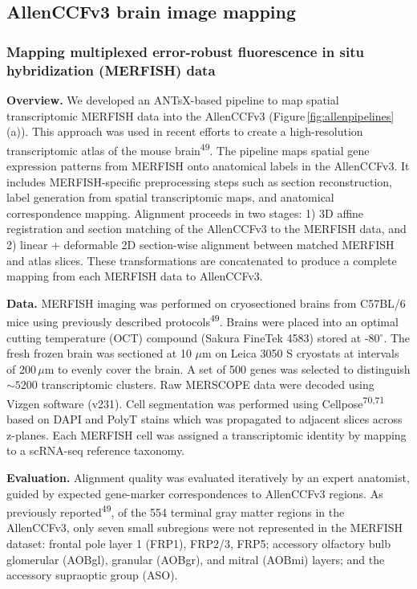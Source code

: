 \documentclass[
  12pt,
]{article}
\begin{document}
\subsection{AllenCCFv3 brain image
mapping}\label{allenccfv3-brain-image-mapping}

\subsubsection{Mapping multiplexed error-robust fluorescence in situ
hybridization (MERFISH)
data}\label{mapping-multiplexed-error-robust-fluorescence-in-situ-hybridization-merfish-data}

\textbf{Overview.} We developed an ANTsX-based pipeline to map spatial
transcriptomic MERFISH data into the AllenCCFv3
(Figure\,\ref{fig:allenpipelines}(a)). This approach was used in recent
efforts to create a high-resolution transcriptomic atlas of the mouse
brain\textsuperscript{49}. The pipeline maps spatial gene expression
patterns from MERFISH onto anatomical labels in the AllenCCFv3. It
includes MERFISH-specific preprocessing steps such as section
reconstruction, label generation from spatial transcriptomic maps, and
anatomical correspondence mapping. Alignment proceeds in two stages: 1)
3D affine registration and section matching of the AllenCCFv3 to the
MERFISH data, and 2) linear + deformable 2D section-wise alignment
between matched MERFISH and atlas slices. These transformations are
concatenated to produce a complete mapping from each MERFISH data to
AllenCCFv3.

\textbf{Data.} MERFISH imaging was performed on cryosectioned brains
from C57BL/6 mice using previously described
protocols\textsuperscript{49}. Brains were placed into an optimal
cutting temperature (OCT) compound (Sakura FineTek 4583) stored at
-80\(^\circ\). The fresh frozen brain was sectioned at 10 \(\mu\)m on
Leica 3050 S cryostats at intervals of 200\,\(\mu\)m to evenly cover the
brain. A set of 500 genes was selected to distinguish \(\sim5200\)
transcriptomic clusters. Raw MERSCOPE data were decoded using Vizgen
software (v231). Cell segmentation was performed using
Cellpose\textsuperscript{70,71} based on DAPI and PolyT stains which was
propagated to adjacent slices across z-planes. Each MERFISH cell was
assigned a transcriptomic identity by mapping to a scRNA-seq reference
taxonomy.

\textbf{Evaluation.} Alignment quality was evaluated iteratively by an
expert anatomist, guided by expected gene-marker correspondences to
AllenCCFv3 regions. As previously reported\textsuperscript{49}, of the
554 terminal gray matter regions in the AllenCCFv3, only seven small
subregions were not represented in the MERFISH dataset: frontal pole
layer 1 (FRP1), FRP2/3, FRP5; accessory olfactory bulb glomerular
(AOBgl), granular (AOBgr), and mitral (AOBmi) layers; and the accessory
supraoptic group (ASO).
\end{document}
